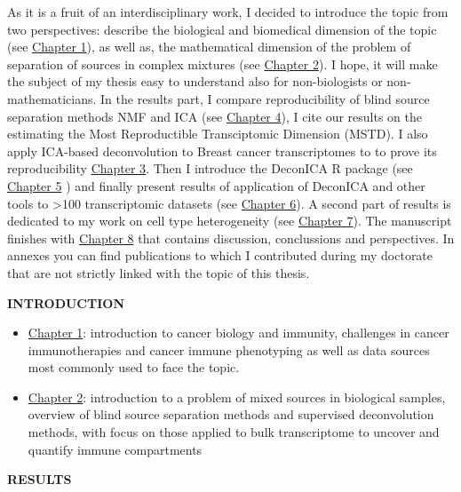 \documentclass[12pt,]{book}
\theoremstyle{definition}
\theoremstyle{definition}
\theoremstyle{definition}
\theoremstyle{remark}
\begin{document}
As it is a fruit of an interdisciplinary work, I decided to introduce
the topic from two perspectives: describe the biological and biomedical
dimension of the topic (see \protect\hyperlink{intro}{Chapter 1}), as
well as, the mathematical dimension of the problem of separation of
sources in complex mixtures (see \protect\hyperlink{methods}{Chapter
2}). I hope, it will make the subject of my thesis easy to understand
also for non-biologists or non-mathematicians. In the results part, I
compare reproducibility of blind source separation methods NMF and ICA
(see \protect\hyperlink{sens}{Chapter 4}), I cite our results on the
estimating the Most Reproductible Transciptomic Dimension (MSTD). I also
apply ICA-based deconvolution to Breast cancer transcriptomes to to
prove its reproducibility \protect\hyperlink{LVA}{Chapter 3}. Then I
introduce the DeconICA R package (see
\protect\hyperlink{deconica}{Chapter 5} ) and finally present results of
application of DeconICA and other tools to \textgreater{}100
transcriptomic datasets (see \protect\hyperlink{results}{Chapter 6}). A
second part of results is dedicated to my work on cell type
heterogeneity (see \protect\hyperlink{map}{Chapter 7}). The manuscript
finishes with \protect\hyperlink{conclusions}{Chapter 8} that contains
discussion, conclussions and perspectives. In annexes you can find
publications to which I contributed during my doctorate that are not
strictly linked with the topic of this thesis.

\textbf{INTRODUCTION}

\begin{itemize}
\item
  \protect\hyperlink{intro}{Chapter 1}: introduction to cancer biology
  and immunity, challenges in cancer immunotherapies and cancer immune
  phenotyping as well as data sources most commonly used to face the
  topic.
\item
  \protect\hyperlink{methods}{Chapter 2}: introduction to a problem of
  mixed sources in biological samples, overview of blind source
  separation methods and supervised deconvolution methods, with focus on
  those applied to bulk transcriptome to uncover and quantify immune
  compartments
\end{itemize}

\textbf{RESULTS}
\end{document}
